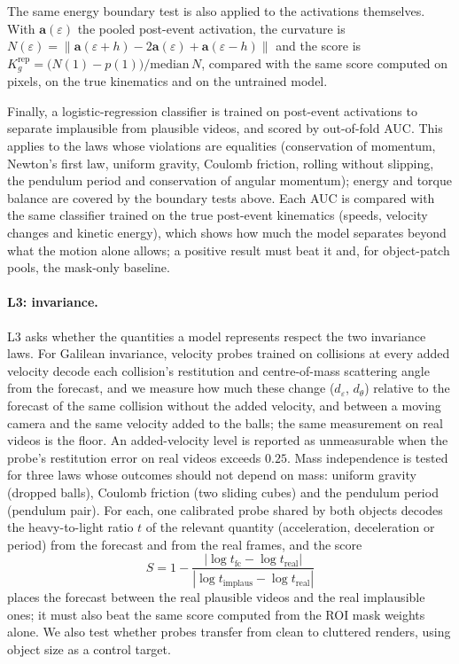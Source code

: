 \documentclass[10pt]{article}
\newcommand{\eps}{\varepsilon}
\begin{document}
The same energy boundary test is also applied to the activations themselves. With $\mathbf a(\eps)$ the pooled
post-event activation, the curvature is $N(\eps)=\|\mathbf a(\eps+h)-2\mathbf a(\eps)+\mathbf a(\eps-h)\|$ and the score
is $K^{\mathrm{rep}}_g=\big(N(1)-p(1)\big)/\mathrm{median}\,N$, compared with the same score computed on pixels, on the
true kinematics and on the untrained model.

Finally, a logistic-regression classifier is trained on post-event activations to separate implausible from
plausible videos, and scored by out-of-fold AUC. This applies to the laws whose violations are equalities
(conservation of momentum, Newton's first law, uniform gravity, Coulomb friction, rolling without slipping, the
pendulum period and conservation of angular momentum); energy and torque balance are covered by the boundary tests above. Each AUC is compared with the same
classifier trained on the true post-event kinematics (speeds, velocity changes and kinetic energy), which shows how
much the model separates beyond what the motion alone allows; a positive result must beat it and, for object-patch
pools, the mask-only baseline.

\paragraph{L3: invariance.}
L3 asks whether the quantities a model represents respect the two invariance laws. For Galilean invariance, velocity
probes trained on collisions at every added velocity decode each collision's restitution and centre-of-mass scattering
angle from the forecast, and we measure how much these change ($d_\eps$, $d_\theta$) relative to the forecast of the same
collision without the added velocity, and between a moving camera and the same velocity added to the balls; the same
measurement on real videos is the floor. An added-velocity level is reported as unmeasurable when the probe's restitution error on real videos
exceeds $0.25$. Mass independence is tested for three laws whose outcomes should not depend on mass: uniform gravity
(dropped balls), Coulomb friction (two sliding cubes) and the pendulum period (pendulum pair). For each, one calibrated probe shared by both objects decodes
the heavy-to-light ratio $t$ of the relevant quantity (acceleration, deceleration or period) from the forecast and from
the real frames, and the score
\[
S=1-\frac{|\log t_{\mathrm{fc}}-\log t_{\mathrm{real}}|}{|\log t_{\mathrm{implaus}}-\log t_{\mathrm{real}}|}
\]
places the forecast between the real plausible videos and the real implausible ones; it must also beat the same score
computed from the ROI mask weights alone. We also test whether probes
transfer from clean to cluttered renders, using object size as a control target.
\end{document}

